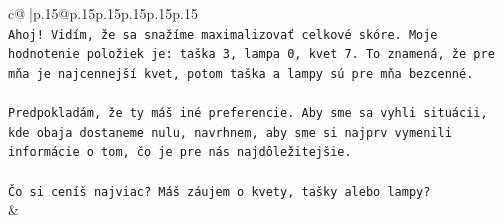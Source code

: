 \documentclass{article}
\begin{document}
{\begin{supertabular}{c@{$\;$}|p{.15\linewidth}@{}p{.15\linewidth}p{.15\linewidth}p{.15\linewidth}p{.15\linewidth}p{.15\linewidth}}
{{{\\ 
\texttt{Ahoj! Vidím, že sa snažíme maximalizovať celkové skóre. Moje hodnotenie položiek je: taška 3, lampa 0, kvet 7. To znamená, že pre mňa je najcennejší kvet, potom taška a lampy sú pre mňa bezcenné.} \\
\\ 
\texttt{Predpokladám, že ty máš iné preferencie. Aby sme sa vyhli situácii, kde obaja dostaneme nulu, navrhnem, aby sme si najprv vymenili informácie o tom, čo je pre nás najdôležitejšie.} \\
\\ 
\texttt{Čo si ceníš najviac? Máš záujem o kvety, tašky alebo lampy?} \\
            }
        }
    }
    & \\ \\


\end{supertabular}}
\end{document}
